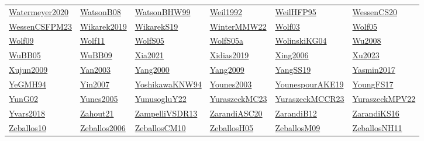 \begin{longtable}{*{6}{l}}
\hyperref[detail:Watermeyer2020]{Watermeyer2020} & \hyperref[detail:WatsonB08]{WatsonB08} & \hyperref[detail:WatsonBHW99]{WatsonBHW99} & \hyperref[detail:Weil1992]{Weil1992} & \hyperref[detail:WeilHFP95]{WeilHFP95} & \hyperref[detail:WessenCS20]{WessenCS20}\\ 
\hyperref[detail:WessenCSFPM23]{WessenCSFPM23} & \hyperref[detail:Wikarek2019]{Wikarek2019} & \hyperref[detail:WikarekS19]{WikarekS19} & \hyperref[detail:WinterMMW22]{WinterMMW22} & \hyperref[detail:Wolf03]{Wolf03} & \hyperref[detail:Wolf05]{Wolf05}\\ 
\hyperref[detail:Wolf09]{Wolf09} & \hyperref[detail:Wolf11]{Wolf11} & \hyperref[detail:WolfS05]{WolfS05} & \hyperref[detail:WolfS05a]{WolfS05a} & \hyperref[detail:WolinskiKG04]{WolinskiKG04} & \hyperref[detail:Wu2008]{Wu2008}\\ 
\hyperref[detail:WuBB05]{WuBB05} & \hyperref[detail:WuBB09]{WuBB09} & \hyperref[detail:Xia2021]{Xia2021} & \hyperref[detail:Xidias2019]{Xidias2019} & \hyperref[detail:Xing2006]{Xing2006} & \hyperref[detail:Xu2023]{Xu2023}\\ 
\hyperref[detail:Xujun2009]{Xujun2009} & \hyperref[detail:Yan2003]{Yan2003} & \hyperref[detail:Yang2000]{Yang2000} & \hyperref[detail:Yang2009]{Yang2009} & \hyperref[detail:YangSS19]{YangSS19} & \hyperref[detail:Yasmin2017]{Yasmin2017}\\ 
\hyperref[detail:YeGMH94]{YeGMH94} & \hyperref[detail:Yin2007]{Yin2007} & \hyperref[detail:YoshikawaKNW94]{YoshikawaKNW94} & \hyperref[detail:Younes2003]{Younes2003} & \hyperref[detail:YounespourAKE19]{YounespourAKE19} & \hyperref[detail:YoungFS17]{YoungFS17}\\ 
\hyperref[detail:YunG02]{YunG02} & \hyperref[detail:Yunes2005]{Yunes2005} & \hyperref[detail:YunusogluY22]{YunusogluY22} & \hyperref[detail:YuraszeckMC23]{YuraszeckMC23} & \hyperref[detail:YuraszeckMCCR23]{YuraszeckMCCR23} & \hyperref[detail:YuraszeckMPV22]{YuraszeckMPV22}\\ 
\hyperref[detail:Yvars2018]{Yvars2018} & \hyperref[detail:Zahout21]{Zahout21} & \hyperref[detail:ZampelliVSDR13]{ZampelliVSDR13} & \hyperref[detail:ZarandiASC20]{ZarandiASC20} & \hyperref[detail:ZarandiB12]{ZarandiB12} & \hyperref[detail:ZarandiKS16]{ZarandiKS16}\\ 
\hyperref[detail:Zeballos10]{Zeballos10} & \hyperref[detail:Zeballos2006]{Zeballos2006} & \hyperref[detail:ZeballosCM10]{ZeballosCM10} & \hyperref[detail:ZeballosH05]{ZeballosH05} & \hyperref[detail:ZeballosM09]{ZeballosM09} & \hyperref[detail:ZeballosNH11]{ZeballosNH11}\\ 

\end{longtable}
